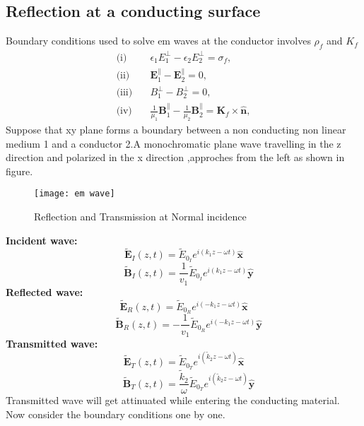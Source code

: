 \subsection{Reflection at a conducting surface}
Boundary conditions used to solve em waves at the conductor involves $\rho_f$ and $K_f$
\begin{align*}
\text{(i)}\quad&\epsilon_{1} E_{1}^{\perp}-\epsilon_{2} E_{2}^{\perp}=\sigma_{f},\\
\text{(ii)}\quad&\mathbf{E}_{1}^{\|}-\mathbf{E}_{2}^{\|}=0,\\
\text{(iii)}\quad&B_{1}^{\perp}-B_{2}^{\perp}=0,\\
\text{(iv)}\quad&\frac{1}{\mu_{1}} \mathbf{B}_{1}^{\|}-\frac{1}{\mu_{2}} \mathbf{B}_{2}^{\|}=\mathbf{K}_{f} \times \hat{\mathbf{n}},
\end{align*}
Suppose that xy plane forms a boundary between a non conducting non linear medium 1 and a conductor 2.A monochromatic plane wave travelling in the z direction and polarized in the x direction ,approches from the left as shown in figure.\\
\begin{figure}[H]
	\centering
	\texttt{[image: em wave]}
	\caption{Reflection and Transmission at Normal incidence}
	\label{Reflection and Transmission at Normal incidence}
\end{figure}
\textbf{Incident wave:}
$$\tilde{\mathbf{E}}_{I}(z, t)=\tilde{E}_{0_{I}} e^{i\left(k_{1} z-\omega t\right)} \hat{\mathbf{x}}$$
$$ \quad \tilde{\mathbf{B}}_{I}(z, t)=\frac{1}{v_{1}} \tilde{E}_{0_{I}} e^{i\left(k_{1} z-\omega t\right)} \hat{\mathbf{y}}$$
\textbf{Reflected wave:}
$$\tilde{\mathbf{E}}_{R}(z, t)=\tilde{E}_{0_{R}} e^{i\left(-k_{1} z-\omega t\right)} \hat{\mathbf{x}}$$
$$ \quad \tilde{\mathbf{B}}_{R}(z, t)=-\frac{1}{v_{1}} \tilde{E}_{0_{R}} e^{i\left(-k_{1} z-\omega t\right)} \hat{\mathbf{y}}$$
\textbf{Transmitted wave:}
$$\tilde{\mathbf{E}}_{T}(z, t)=\tilde{E}_{0_{T}} e^{i\left(\tilde{k}_{2} z-\omega t\right)} \hat{\mathbf{x}}$$
$$ \quad \tilde{\mathbf{B}}_{T}(z, t)=\frac{\tilde{k}_{2}}{\omega} \tilde{E}_{0_{T}} e^{i\left(\tilde{k}_{2} z-\omega t\right)} \hat{\mathbf{y}}$$
Transmitted wave will get attinuated while entering the conducting material.\\
Now consider the boundary conditions one by one.
